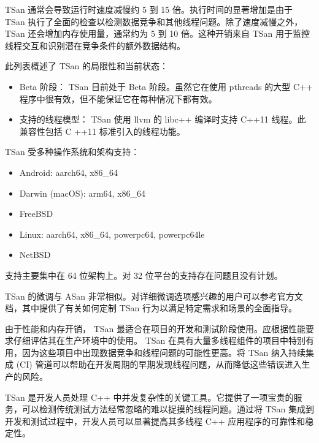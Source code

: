 
TSan 通常会导致运行时速度减慢约 5 到 15 倍。执行时间的显著增加是由于 TSan 执行了全面的检查以检测数据竞争和其他线程问题。除了速度减慢之外， TSan 还会增加内存使用量，通常约为 5 到 10 倍。这种开销来自 TSan 用于监控线程交互和识别潜在竞争条件的额外数据结构。

此列表概述了 TSan 的局限性和当前状态：

\begin{itemize}
\item
Beta 阶段： TSan 目前处于 Beta 阶段。虽然它在使用 pthreads 的大型 C++ 程序中很有效，但不能保证它在每种情况下都有效。

\item
支持的线程模型： TSan 使用 llvm 的 libc++ 编译时支持 C++11 线程。此兼容性包括 C ++11 标准引入的线程功能。
\end{itemize}

TSan 受多种操作系统和架构支持：

\begin{itemize}
\item
Android: aarch64, x86\_64

\item
Darwin (macOS): arm64, x86\_64

\item
FreeBSD

\item
Linux: aarch64, x86\_64, powerpc64, powerpc64le

\item
NetBSD
\end{itemize}

支持主要集中在 64 位架构上。对 32 位平台的支持存在问题且没有计划。


TSan 的微调与 ASan 非常相似。对详细微调选项感兴趣的用户可以参考官方文档，其中提供了有关如何定制 TSan 行为以满足特定需求和场景的全面指导。


由于性能和内存开销， TSan 最适合在项目的开发和测试阶段使用。应根据性能要求仔细评估其在生产环境中的使用。 TSan 在具有大量多线程组件的项目中特别有用，因为这些项目中出现数据竞争和线程问题的可能性更高。将 TSan 纳入持续集成 (CI) 管道可以帮助在开发周期的早期发现线程问题，从而降低这些错误进入生产的风险。

TSan 是开发人员处理 C++ 中并发复杂性的关键工具。它提供了一项宝贵的服务，可以检测传统测试方法经常忽略的难以捉摸的线程问题。通过将 TSan 集成到开发和测试过程中，开发人员可以显著提高其多线程 C++ 应用程序的可靠性和稳定性。

